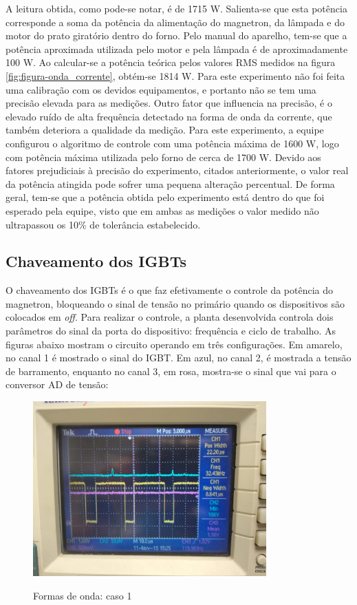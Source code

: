 A leitura obtida, como pode-se notar, é de 1715 W. Salienta-se que esta potência corresponde a soma da potência da alimentação do magnetron, da lâmpada e do motor do prato giratório dentro do forno. Pelo manual do aparelho, tem-se que a potência aproximada utilizada pelo motor e pela lâmpada é de aproximadamente 100 W. Ao calcular-se a potência teórica pelos valores RMS medidos na figura \ref{fig:figura-onda_corrente}, obtém-se 1814 W. Para este experimento não foi feita uma calibração com os devidos equipamentos, e portanto não se tem uma precisão elevada para as medições. Outro fator que influencia na precisão, é o elevado ruído de alta frequência detectado na forma de onda da corrente, que também deteriora a qualidade da medição. Para este experimento, a equipe configurou o algoritmo de controle com uma potência máxima de 1600 W, logo com potência máxima utilizada pelo forno de cerca de 1700 W. Devido aos fatores prejudiciais à precisão do experimento, citados anteriormente, o valor real da potência atingida pode sofrer uma pequena alteração percentual. De forma geral, tem-se que a potência obtida pelo experimento está dentro do que foi esperado pela equipe, visto que em ambas as medições o valor medido não ultrapassou os 10\% de tolerância estabelecido.

\subsection{Chaveamento dos IGBTs}
O chaveamento dos IGBTs é o que faz efetivamente o controle da potência do magnetron, bloqueando o sinal de tensão no primário quando os dispositivos são colocados em \textit{off}. Para realizar o controle, a planta desenvolvida controla dois parâmetros do sinal da porta do dispositivo: frequência e ciclo de trabalho. As figuras abaixo mostram o circuito operando em três configurações. Em amarelo, no canal 1 é mostrado o sinal do IGBT. Em azul, no canal 2, é mostrada a tensão de barramento, enquanto no canal 3, em rosa, mostra-se o sinal que vai para o conversor AD de tensão:

\begin{figure}[H]
    \centering
    \caption{Formas de onda: caso 1}
    \includegraphics[width=0.8\textwidth]{./dados/figuras/onda_controller_1}
    \label{fig:figura-onda_controller_1}
\end{figure}

